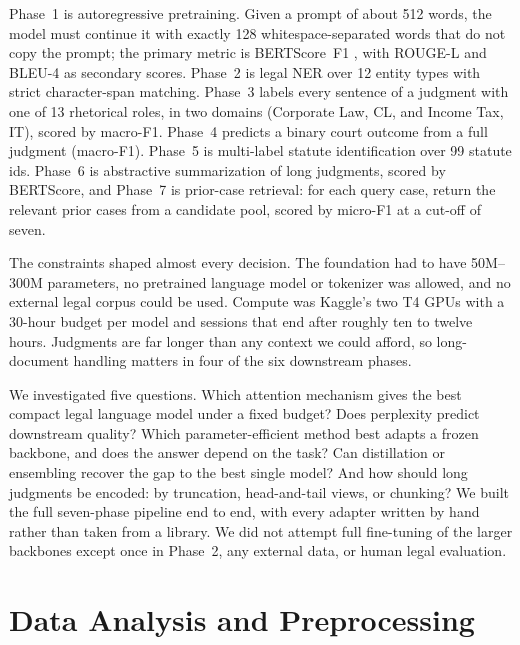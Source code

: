 \documentclass[11pt, oneside]{article}
\begin{document}
Phase~1 is autoregressive pretraining. Given a prompt of about 512 words, the model must continue it with exactly 128 whitespace-separated words that do not copy the prompt; the primary metric is BERTScore~F1 \cite{zhang2020bertscore}, with ROUGE-L \cite{lin2004rouge} and BLEU-4 \cite{papineni2002bleu} as secondary scores. Phase~2 is legal NER over 12 entity types with strict character-span matching. Phase~3 labels every sentence of a judgment with one of 13 rhetorical roles, in two domains (Corporate Law, CL, and Income Tax, IT), scored by macro-F1. Phase~4 predicts a binary court outcome from a full judgment (macro-F1). Phase~5 is multi-label statute identification over 99 statute ids. Phase~6 is abstractive summarization of long judgments, scored by BERTScore, and Phase~7 is prior-case retrieval: for each query case, return the relevant prior cases from a candidate pool, scored by micro-F1 at a cut-off of seven.

The constraints shaped almost every decision. The foundation had to have 50M--300M parameters, no pretrained language model or tokenizer was allowed, and no external legal corpus could be used. Compute was Kaggle's two T4 GPUs with a 30-hour budget per model and sessions that end after roughly ten to twelve hours. Judgments are far longer than any context we could afford, so long-document handling matters in four of the six downstream phases.

We investigated five questions. Which attention mechanism gives the best compact legal language model under a fixed budget? Does perplexity predict downstream quality? Which parameter-efficient method best adapts a frozen backbone, and does the answer depend on the task? Can distillation or ensembling recover the gap to the best single model? And how should long judgments be encoded: by truncation, head-and-tail views, or chunking? We built the full seven-phase pipeline end to end, with every adapter written by hand rather than taken from a library. We did not attempt full fine-tuning of the larger backbones except once in Phase~2, any external data, or human legal evaluation.

\section{Data Analysis and Preprocessing}
\end{document}
